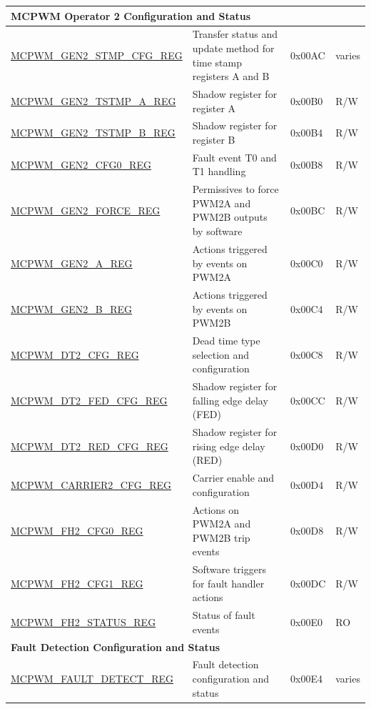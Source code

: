 \begin{longtable}{ | p{6cm} | p{7.2cm} | p{1.3cm} | p{1cm} | }
\multicolumn{4}{|l|}{\textbf{MCPWM Operator 2 Configuration and Status}} \\ \hline
\hyperref[regdesc:MCPWMGEN2STMPCFGREG]{MCPWM\_GEN2\_STMP\_CFG\_REG} & Transfer status and update method for time stamp registers A and B & 0x00AC & varies \\ \hline
\hyperref[regdesc:MCPWMGEN2TSTMPAREG]{MCPWM\_GEN2\_TSTMP\_A\_REG} & Shadow register for register A & 0x00B0 & R/W \\ \hline
\hyperref[regdesc:MCPWMGEN2TSTMPBREG]{MCPWM\_GEN2\_TSTMP\_B\_REG} & Shadow register for register B & 0x00B4 & R/W \\ \hline
\hyperref[regdesc:MCPWMGEN2CFG0REG]{MCPWM\_GEN2\_CFG0\_REG} & Fault event T0 and T1 handling & 0x00B8 & R/W \\ \hline
\hyperref[regdesc:MCPWMGEN2FORCEREG]{MCPWM\_GEN2\_FORCE\_REG} & Permissives to force PWM2A and PWM2B outputs by software & 0x00BC & R/W \\ \hline
\hyperref[regdesc:MCPWMGEN2AREG]{MCPWM\_GEN2\_A\_REG} & Actions triggered by events on PWM2A & 0x00C0 & R/W \\ \hline
\hyperref[regdesc:MCPWMGEN2BREG]{MCPWM\_GEN2\_B\_REG} & Actions triggered by events on PWM2B & 0x00C4 & R/W \\ \hline
\hyperref[regdesc:MCPWMDT2CFGREG]{MCPWM\_DT2\_CFG\_REG} & Dead time type selection and configuration & 0x00C8 & R/W \\ \hline
\hyperref[regdesc:MCPWMDT2FEDCFGREG]{MCPWM\_DT2\_FED\_CFG\_REG} & Shadow register for falling edge delay (FED) & 0x00CC & R/W \\ \hline
\hyperref[regdesc:MCPWMDT2REDCFGREG]{MCPWM\_DT2\_RED\_CFG\_REG} & Shadow register for rising edge delay (RED) & 0x00D0 & R/W \\ \hline
\hyperref[regdesc:MCPWMCARRIER2CFGREG]{MCPWM\_CARRIER2\_CFG\_REG} & Carrier enable and configuration & 0x00D4 & R/W \\ \hline
\hyperref[regdesc:MCPWMFH2CFG0REG]{MCPWM\_FH2\_CFG0\_REG} & Actions on PWM2A and PWM2B trip events & 0x00D8 & R/W \\ \hline
\hyperref[regdesc:MCPWMFH2CFG1REG]{MCPWM\_FH2\_CFG1\_REG} & Software triggers for fault handler actions & 0x00DC & R/W \\ \hline
\hyperref[regdesc:MCPWMFH2STATUSREG]{MCPWM\_FH2\_STATUS\_REG} & Status of fault events & 0x00E0 & RO \\ \hline

\multicolumn{4}{|l|}{\textbf{Fault Detection Configuration and Status}} \\ \hline
\hyperref[regdesc:MCPWMFAULTDETECTREG]{MCPWM\_FAULT\_DETECT\_REG} & Fault detection configuration and status & 0x00E4 & varies \\ \hline


\end{longtable}
